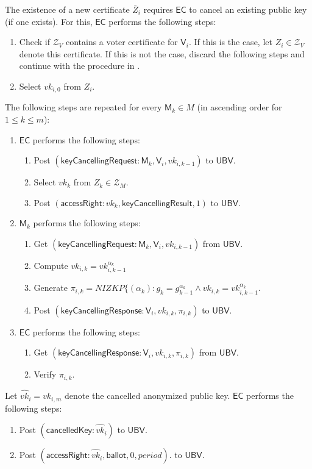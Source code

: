 \documentclass[bibtotoc,halfparskip,oneside]{scrreprt}
\newcommand{\period}{\mathit{period}\xspace}
\newcommand{\vk}[1]{\mathit{vk}_{#1}\xspace}
\newcommand{\vkhat}[1]{\hat{\mathit{vk}}_{#1}\xspace}
\newcommand{\EC}{\ensuremath{\mathsf{EC}}\xspace}
\newcommand{\UBV}{\ensuremath{\mathsf{UBV}}\xspace}
\newcommand{\Mixer}[1]{\ensuremath{\mathsf{M}_{#1}}\xspace}
\newcommand{\Voter}[1]{\ensuremath{\mathsf{V}_{#1}}\xspace}
\begin{document}
The existence of a new certificate $\bar{Z}_i$ requires \EC to cancel an existing public key (if one exists). For this, \EC performs the following steps: 
\begin{enumerate}
	\item Check if $\mathcal{Z}_V$ contains a voter certificate for $\Voter{i}$. If this is the case, let $Z_i\in\mathcal{Z}_V$ denote this certificate. If this is not the case, discard the following steps and continue with the procedure in .
	\item Select $\vk{i,0}$ from $Z_i$.
\end{enumerate}	
The following steps are repeated for every $\Mixer{k}\in M$ (in ascending order for $1\leq k\leq m$):
\begin{enumerate}[resume]
	\item \EC performs the following steps:
	\begin{enumerate}
		\item Post $(\mathsf{keyCancellingRequest}:\Mixer{k}, \Voter{i}, \vk{i,k-1})$ to \UBV.
		\item Select $\vk{k}$ from $Z_{k}\in \mathcal{Z}_{M}$.
		\item Post $(\mathsf{accessRight}:\vk{k},\mathsf{keyCancellingResult},1)$ to \UBV.
	\end{enumerate}
	\item $\Mixer{k}$ performs the following steps:
	\begin{enumerate}
		\item Get $(\mathsf{keyCancellingRequest}: \Mixer{k}, \Voter{i}, \vk{i,k-1})$ from \UBV.
		\item Compute $\vk{i,k} = \vk{i,k-1}^{\alpha_k}$
		\item Generate $\pi_{i,k}=\mathit{NIZKP}\{(\alpha_k):g_k=g_{k-1}^{\alpha_k}\wedge \vk{i,k} = \vk{i,k-1}^{\alpha_k}$.
		\item Post $(\mathsf{keyCancellingResponse}:\Voter{i}, \vk{i,k}, \pi_{i,k})$ to \UBV.
	\end{enumerate}
	\item \EC performs the following steps:
	\begin{enumerate}
		\item Get $(\mathsf{keyCancellingResponse}:\Voter{i}, \vk{i,k}, \pi_{i,k})$ from \UBV.
		\item Verify $\pi_{i,k}$.
	\end{enumerate}
\end{enumerate}
Let $\vkhat{i}=\vk{i,m}$ denote the cancelled anonymized public key. \EC performs the following steps:
\begin{enumerate}
	\item Post $(\mathsf{cancelledKey}:\vkhat{i})$ to \UBV.
	\item Post $(\mathsf{accessRight}:\vkhat{i}, \mathsf{ballot}, 0,\period)$. to \UBV.
\end{enumerate}
\end{document}
